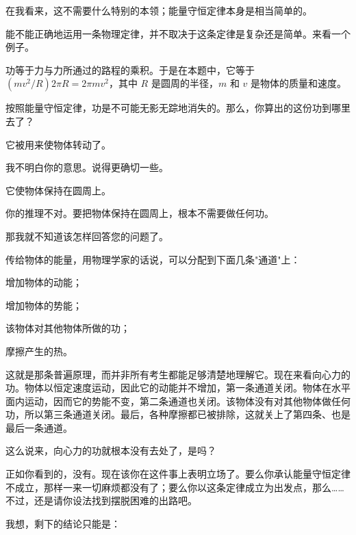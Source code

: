 \begin{dialogue}
\stda 在我看来，这不需要什么特别的本领；能量守恒定律本身是相当简单的。

\tchr 能不能正确地运用一条物理定律，并不取决于这条定律是复杂还是简单。来看一个例子。

\stda 功等于力与力所通过的路程的乘积。于是在本题中，它等于 $(mv^{2}/R) 2 \pi R = 2 \pi mv^{2}$，其中 $R$ 是圆周的半径，$m$ 和 $v$ 是物体的质量和速度。

\tchr 按照能量守恒定律，功是不可能无影无踪地消失的。那么，你算出的这份功到哪里去了？

\stda 它被用来使物体转动了。

\tchr 我不明白你的意思。说得更确切一些。

\stda 它使物体保持在圆周上。

\tchr 你的推理不对。要把物体保持在圆周上，根本不需要做任何功。

\stda 那我就不知道该怎样回答您的问题了。

\tchr 传给物体的能量，用物理学家的话说，可以分配到下面几条"通道"上：
\begin{enumerate*}[label=(\arabic*)]
\item 增加物体的动能；
\item 增加物体的势能；
\item 该物体对其他物体所做的功；
\item 摩擦产生的热。
\end{enumerate*}
这就是那条普遍原理，而并非所有考生都能足够清楚地理解它。现在来看向心力的功。物体以恒定速度运动，因此它的动能并不增加，第一条通道关闭。物体在水平面内运动，因而它的势能不变，第二条通道也关闭。该物体没有对其他物体做任何功，所以第三条通道关闭。最后，各种摩擦都已被排除，这就关上了第四条、也是最后一条通道。

\stda 这么说来，向心力的功就根本没有去处了，是吗？

\tchr 正如你看到的，没有。现在该你在这件事上表明立场了。要么你承认能量守恒定律不成立，那样一来一切麻烦都没有了；要么你以这条定律成立为出发点，那么……不过，还是请你设法找到摆脱困难的出路吧。

\stda 我想，剩下的结论只能是：


\end{dialogue}
